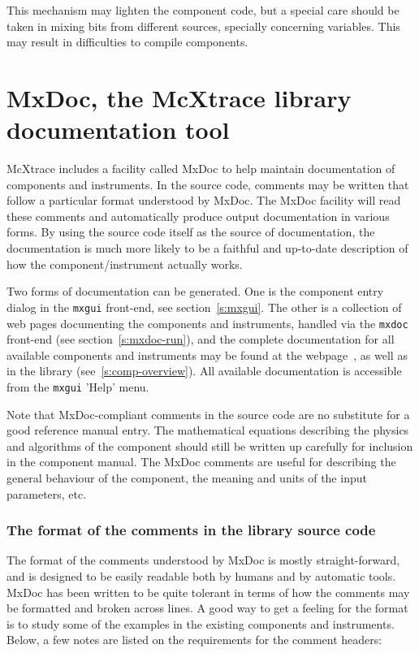 This mechanism may lighten the component code, but a special care should be taken in mixing bits from different sources, specially concerning variables. This may result in difficulties to compile components.

\section{MxDoc, the McXtrace library documentation tool}
\label{s:mxdoc}

McXtrace includes a facility called MxDoc to help maintain documentation of
components and instruments. In the source code, comments may be
written that follow a particular format understood by MxDoc. The MxDoc facility
will read these comments and automatically produce output documentation in
various forms. By using the source code itself as the source of documentation,
the documentation is much more likely to be a faithful and up-to-date
description of how the component/instrument actually works.

Two forms of documentation can be generated. One
is the component entry dialog in the \verb+mxgui+ front-end, see
section~\ref{s:mxgui}. The other is a collection of web pages documenting
the components and instruments, handled via the \verb+mxdoc+ front-end (see section~\ref{s:mxdoc-run}), and the complete documentation for all available
\MCX components and instruments may be found at the \MCX
webpage~\cite{mcxtrace_webpage}, as well as in the \MCX library
(see~\ref{s:comp-overview}). All available \MCX documentation is accessible from the \verb+mxgui+ 'Help' menu.

Note that MxDoc-compliant comments in the source code are no substitute
for a good reference manual entry. The mathematical equations describing
the physics and algorithms of the component should still be written up
carefully for inclusion in the component manual. The MxDoc comments are
useful for describing the general behaviour of the component, the
meaning and units of the input parameters, etc.


\subsubsection{The format of the comments in the library source code}

The format of the comments understood by MxDoc is mostly
straight-forward, and is designed to be easily readable both by humans
and by automatic tools. MxDoc has been written to be quite tolerant in
terms of how the comments may be formatted and broken across lines. A
good way to get a feeling for the format is to study some of the examples
in the existing components and instruments. Below, a few
notes are listed on the requirements for the comment headers:

